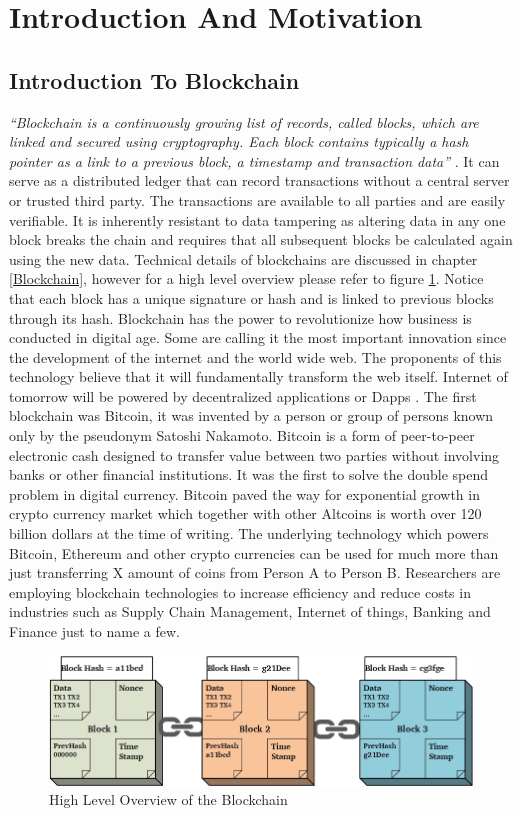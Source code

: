 \section{Introduction And Motivation}
\subsection{Introduction To Blockchain}
\textit{“Blockchain is a continuously growing list of records, called blocks, which are linked and secured using cryptography. Each block contains typically a hash pointer as a link to a previous block, a timestamp and transaction data”} \cite{wiki:001}. It can serve as a distributed ledger that can record transactions without a central server or trusted third party. The transactions are available to all parties and are easily verifiable. It is inherently resistant to data tampering as altering data in any one block breaks the chain and requires that all subsequent blocks be calculated again using the new data. Technical details of blockchains are discussed in chapter \ref{Blockchain}, however for a high level overview please refer to figure \ref{fig:blockchain}. Notice that each block has a unique signature or hash and is linked to previous blocks through its hash. Blockchain has the power to revolutionize how business is conducted in digital age. Some are calling it the most important innovation since the development of the internet and the world wide web. The proponents of this technology believe that it will fundamentally transform the web itself. Internet of tomorrow will be powered by decentralized applications or Dapps \cite{misc:020}. The first blockchain was Bitcoin, it was invented by a person or group of persons known only by the pseudonym Satoshi Nakamoto. Bitcoin is a form of peer-to-peer electronic cash designed to transfer value between two parties without involving banks or other financial institutions. It was the first to solve the double spend problem in digital currency. Bitcoin paved the way for exponential growth in crypto currency market which together with other Altcoins is worth over 120 billion dollars at the time of writing. The underlying technology which powers Bitcoin, Ethereum and other crypto currencies can be used for much more than just transferring X amount of coins from Person A to Person B. Researchers are employing blockchain technologies to increase efficiency and reduce costs in industries such as Supply Chain Management, Internet of things, Banking and Finance just to name a few.

\begin{figure}[b]
	\centering
    \includegraphics[width=160mm,scale=0.5]{figs/blockchain}
	\caption{High Level Overview of the Blockchain}
	\label{fig:blockchain}
\end{figure}
\clearpage  
